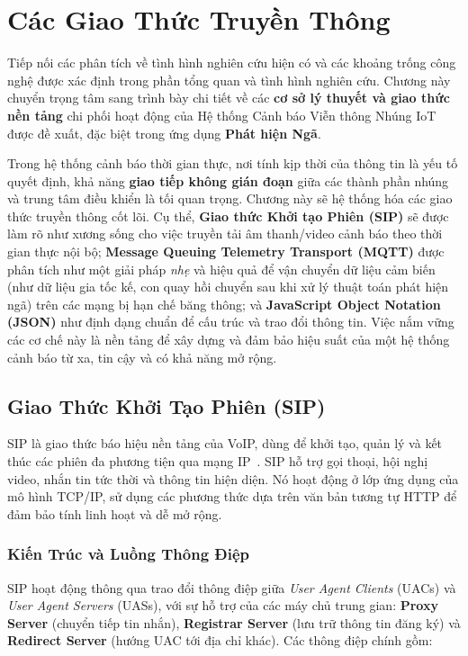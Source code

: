 \section{Các Giao Thức Truyền Thông}
\label{sec:communication_protocols}
Tiếp nối các phân tích về tình hình nghiên cứu hiện có và các khoảng trống công nghệ được xác định trong phần tổng quan và tình hình nghiên cứu. Chương này chuyển trọng tâm sang trình bày chi tiết về các \textbf{cơ sở lý thuyết và giao thức nền tảng} chi phối hoạt động của Hệ thống Cảnh báo Viễn thông Nhúng IoT được đề xuất, đặc biệt trong ứng dụng \textbf{Phát hiện Ngã}.

Trong hệ thống cảnh báo thời gian thực, nơi tính kịp thời của thông tin là yếu tố quyết định, khả năng \textbf{giao tiếp không gián đoạn} giữa các thành phần nhúng và trung tâm điều khiển là tối quan trọng. Chương này sẽ hệ thống hóa các giao thức truyền thông cốt lõi. Cụ thể, \textbf{Giao thức Khởi tạo Phiên (SIP)} sẽ được làm rõ như xương sống cho việc truyền tải âm thanh/video cảnh báo theo thời gian thực nội bộ; \textbf{Message Queuing Telemetry Transport (MQTT)} được phân tích như một giải pháp \textit{nhẹ} và hiệu quả để vận chuyển dữ liệu cảm biến (như dữ liệu gia tốc kế, con quay hồi chuyển sau khi xử lý thuật toán phát hiện ngã) trên các mạng bị hạn chế băng thông; và \textbf{JavaScript Object Notation (JSON)} như định dạng chuẩn để cấu trúc và trao đổi thông tin. Việc nắm vững các cơ chế này là nền tảng để xây dựng và đảm bảo hiệu suất của một hệ thống cảnh báo từ xa, tin cậy và có khả năng mở rộng.
\subsection{Giao Thức Khởi Tạo Phiên (SIP)}
\label{subsec:sip_protocol}

SIP là giao thức báo hiệu nền tảng của VoIP, dùng để khởi tạo, quản lý và kết thúc các phiên đa phương tiện qua mạng IP~\cite{sip_rfc3261}. SIP hỗ trợ gọi thoại, hội nghị video, nhắn tin tức thời và thông tin hiện diện. Nó hoạt động ở lớp ứng dụng của mô hình TCP/IP, sử dụng các phương thức dựa trên văn bản tương tự HTTP để đảm bảo tính linh hoạt và dễ mở rộng.

\subsubsection{Kiến Trúc và Luồng Thông Điệp}
\label{subsubsec:sip_architecture}

SIP hoạt động thông qua trao đổi thông điệp giữa \textit{User Agent Clients} (UACs) và \textit{User Agent Servers} (UASs), với sự hỗ trợ của các máy chủ trung gian: \textbf{Proxy Server} (chuyển tiếp tin nhắn), \textbf{Registrar Server} (lưu trữ thông tin đăng ký) và \textbf{Redirect Server} (hướng UAC tới địa chỉ khác). Các thông điệp chính gồm:

